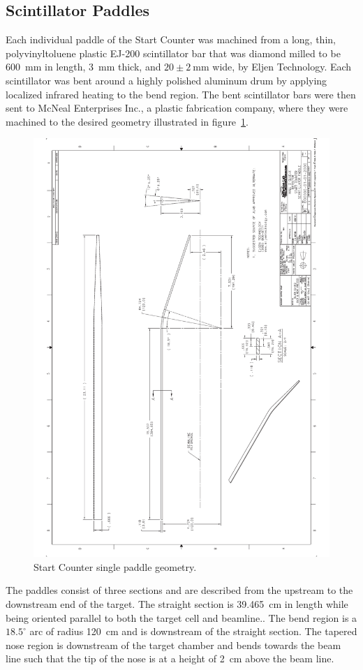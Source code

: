 \subsection{Scintillator Paddles}

Each individual paddle of the Start Counter was machined from a long, thin, polyvinyltoluene plastic EJ-200 scintillator bar that was diamond milled to be 600~mm in length, 3~mm thick, and $\mathrm{20 \pm 2\ mm}$ wide, by Eljen Technology.  Each scintillator was bent around a highly polished aluminum drum by applying localized infrared heating to the bend region.  The bent scintillator bars were then sent to McNeal Enterprises Inc., a plastic fabrication company, where they were machined to the desired geometry illustrated in figure~\ref{fig:Scintillator Geometry}.
\begin{figure}[!htb]
	\centering
	\includegraphics[width=0.7\columnwidth,angle=270.]{design/figs/Scint_Geo}
	\caption[Start Counter single paddle geometry]{Start Counter single paddle geometry.}
	\label{fig:Scintillator Geometry}
\end{figure}

The paddles consist of three sections and are described from the upstream to the downstream end of the target.  The straight section is 39.465~cm in length while being oriented parallel to both the target cell and beamline..  The bend region is a $18.5^{\circ}$ arc of radius 120~cm and is downstream of the straight section. The tapered nose region is downstream of the target chamber and bends towards the beam line such that the tip of the nose is at a height of 2~cm above the beam line.  

